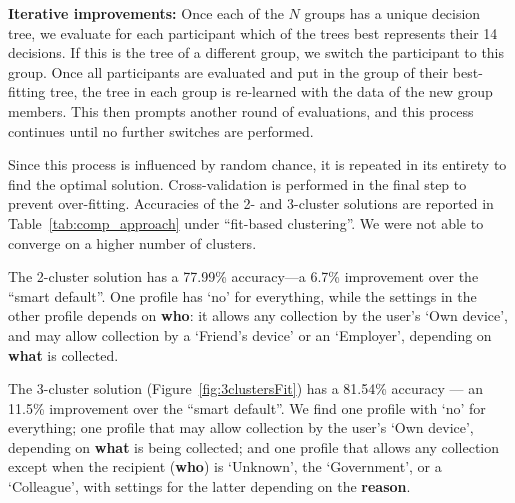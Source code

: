 \textbf{Iterative improvements:} Once each of the $N$ groups has a unique decision tree, we evaluate for each participant which of the trees best represents their 14 decisions. If this is the tree of a different group, we switch the participant to this group. Once all participants are evaluated and put in the group of their best-fitting tree, the tree in each group is re-learned with the data of the new group members. This then prompts another round of evaluations, and this process continues until no further switches are performed. 

Since this process is influenced by random chance, it is repeated in its entirety to find the optimal solution. Cross-validation is performed in the final step to prevent over-fitting. Accuracies of the 2- and 3-cluster solutions are reported in Table~\ref{tab:comp_approach} under ``fit-based clustering''. We were not able to converge on a higher number of clusters. 

The 2-cluster solution has a 77.99\% accuracy---a 6.7\% improvement over the ``smart default''. One profile has `no' for everything, while the settings in the other profile depends on \textbf{who}: it allows any collection by the user's `Own device', and may allow collection by a `Friend's device' or an `Employer', depending on \textbf{what} is collected.



The 3-cluster solution (Figure~\ref{fig:3clustersFit}) has a 81.54\% accuracy --- an 11.5\% improvement over the ``smart default''. We find one profile with `no' for everything; one profile that may allow collection by the user's `Own device', depending on \textbf{what} is being collected; and one profile that allows any collection except when the recipient (\textbf{who}) is `Unknown', the `Government', or a `Colleague', with settings for the latter depending on the \textbf{reason}.

